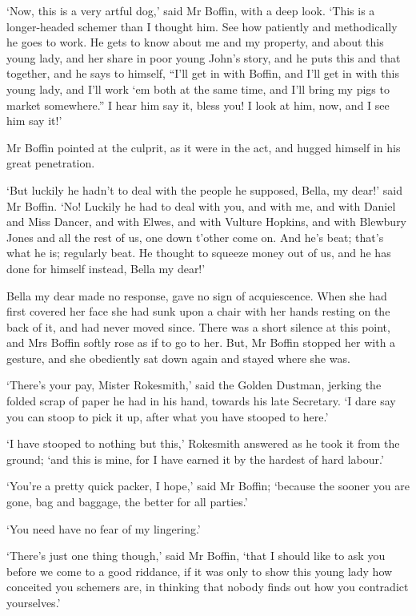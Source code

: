 ‘Now, this is a very artful dog,’ said Mr Boffin, with a deep look.
‘This is a longer-headed schemer than I thought him. See how patiently
and methodically he goes to work. He gets to know about me and my
property, and about this young lady, and her share in poor young John’s
story, and he puts this and that together, and he says to himself, “I’ll
get in with Boffin, and I’ll get in with this young lady, and I’ll work
‘em both at the same time, and I’ll bring my pigs to market somewhere.”
 I hear him say it, bless you! I look at him, now, and I see him say it!’

Mr Boffin pointed at the culprit, as it were in the act, and hugged
himself in his great penetration.

‘But luckily he hadn’t to deal with the people he supposed, Bella, my
dear!’ said Mr Boffin. ‘No! Luckily he had to deal with you, and with
me, and with Daniel and Miss Dancer, and with Elwes, and with Vulture
Hopkins, and with Blewbury Jones and all the rest of us, one down
t’other come on. And he’s beat; that’s what he is; regularly beat. He
thought to squeeze money out of us, and he has done for himself instead,
Bella my dear!’

Bella my dear made no response, gave no sign of acquiescence. When she
had first covered her face she had sunk upon a chair with her hands
resting on the back of it, and had never moved since. There was a short
silence at this point, and Mrs Boffin softly rose as if to go to her.
But, Mr Boffin stopped her with a gesture, and she obediently sat down
again and stayed where she was.

‘There’s your pay, Mister Rokesmith,’ said the Golden Dustman,
jerking the folded scrap of paper he had in his hand, towards his late
Secretary. ‘I dare say you can stoop to pick it up, after what you have
stooped to here.’

‘I have stooped to nothing but this,’ Rokesmith answered as he took it
from the ground; ‘and this is mine, for I have earned it by the hardest
of hard labour.’

‘You’re a pretty quick packer, I hope,’ said Mr Boffin; ‘because the
sooner you are gone, bag and baggage, the better for all parties.’

‘You need have no fear of my lingering.’

‘There’s just one thing though,’ said Mr Boffin, ‘that I should like to
ask you before we come to a good riddance, if it was only to show this
young lady how conceited you schemers are, in thinking that nobody finds
out how you contradict yourselves.’

